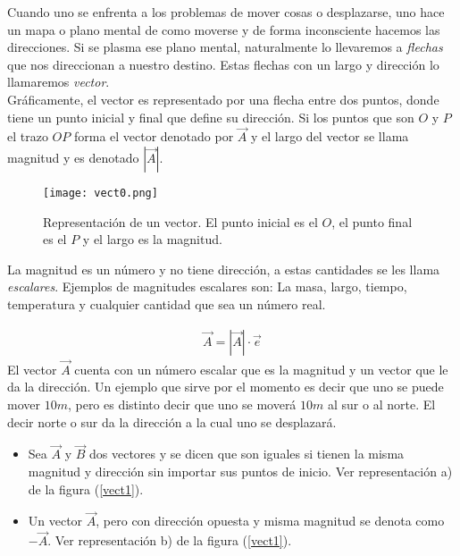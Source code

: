 Cuando uno se enfrenta a los problemas de mover cosas o desplazarse, uno hace un mapa o plano mental de como moverse y de forma inconsciente hacemos las direcciones. Si se plasma ese plano mental, naturalmente lo llevaremos a \textit{flechas} que nos direccionan a nuestro destino. Estas flechas con un largo y dirección lo llamaremos \textit{vector}.\\

Gráficamente, el vector es representado por una flecha entre dos puntos, donde tiene un punto inicial y final que define su dirección. Si los puntos que son $O$ y $P$ el trazo $OP$ forma el vector denotado por $\vec{A}$ y el largo del vector se llama magnitud y es denotado $|\vec{A}|$.\\

 \begin{center}
\begin{figure}[h!]
\centering
\texttt{[image: vect0.png]}
\caption[Representación de un vector.]{Representación de un vector. El punto inicial es el $O$, el punto final es el $P$ y el largo es la magnitud.} \label{vect0}
\end{figure}
\end{center}

La magnitud es un número y no tiene dirección, a estas cantidades se les llama \textit{escalares}. Ejemplos de magnitudes escalares son: La masa, largo, tiempo, temperatura y cualquier cantidad que sea un número real.

\begin{eqnarray}
\vec{A}=|\vec{A}|\cdot\vec{e}
\label{vector0}
\end{eqnarray}
El vector $\vec{A}$ cuenta con un número escalar que es la magnitud y un vector que le da la dirección. Un ejemplo que sirve por el momento es decir que uno se puede mover $10m$, pero es distinto decir que uno se moverá $10m$ al sur o al norte. El decir norte o sur da la dirección a la cual uno se desplazará.
\begin{itemize}
	\item Sea $\vec{A}$ y $\vec{B}$ dos vectores y se dicen que son iguales si tienen la misma magnitud y dirección sin importar sus puntos de inicio. Ver representación a) de la figura (\ref{vect1}).\\
	\item Un vector $\vec{A}$, pero con dirección opuesta y misma magnitud se denota como $-\vec{A}$. Ver representación b) de la figura (\ref{vect1}).
\end{itemize}

